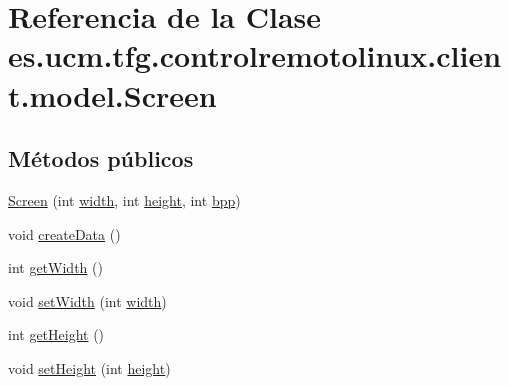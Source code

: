 \hypertarget{classes_1_1ucm_1_1tfg_1_1controlremotolinux_1_1client_1_1model_1_1Screen}{\section{Referencia de la Clase es.\-ucm.\-tfg.\-controlremotolinux.\-client.\-model.\-Screen}
\label{classes_1_1ucm_1_1tfg_1_1controlremotolinux_1_1client_1_1model_1_1Screen}
}
\subsection*{Métodos públicos}
\begin{DoxyCompactItemize}
\item 
\hyperlink{classes_1_1ucm_1_1tfg_1_1controlremotolinux_1_1client_1_1model_1_1Screen_a9a2e9a4494e6d4db5f860ec7693546de}{Screen} (int \hyperlink{classes_1_1ucm_1_1tfg_1_1controlremotolinux_1_1client_1_1model_1_1Screen_ae670efacad579788a6f2520a9b28ab15}{width}, int \hyperlink{classes_1_1ucm_1_1tfg_1_1controlremotolinux_1_1client_1_1model_1_1Screen_a8c3d5e32772854cbe34a7e7d090537f9}{height}, int \hyperlink{classes_1_1ucm_1_1tfg_1_1controlremotolinux_1_1client_1_1model_1_1Screen_a126efcd618ec63cee5f4ffcf5e05d247}{bpp})
\item 
void \hyperlink{classes_1_1ucm_1_1tfg_1_1controlremotolinux_1_1client_1_1model_1_1Screen_aaeeef7ac83037bde5ea65b8a4aa0e9f1}{create\-Data} ()
\item 
int \hyperlink{classes_1_1ucm_1_1tfg_1_1controlremotolinux_1_1client_1_1model_1_1Screen_a81a2766f44791d920f2c611107391dfe}{get\-Width} ()
\item 
void \hyperlink{classes_1_1ucm_1_1tfg_1_1controlremotolinux_1_1client_1_1model_1_1Screen_aa99497e51bfb092b16fd42f108fce9be}{set\-Width} (int \hyperlink{classes_1_1ucm_1_1tfg_1_1controlremotolinux_1_1client_1_1model_1_1Screen_ae670efacad579788a6f2520a9b28ab15}{width})
\item 
int \hyperlink{classes_1_1ucm_1_1tfg_1_1controlremotolinux_1_1client_1_1model_1_1Screen_a20ad4dbd4e8078cfb78b1241fb01f97b}{get\-Height} ()
\item 
void \hyperlink{classes_1_1ucm_1_1tfg_1_1controlremotolinux_1_1client_1_1model_1_1Screen_a1565b6461e787931902665386044bade}{set\-Height} (int \hyperlink{classes_1_1ucm_1_1tfg_1_1controlremotolinux_1_1client_1_1model_1_1Screen_a8c3d5e32772854cbe34a7e7d090537f9}{height})
\item 

\end{DoxyCompactItemize}
